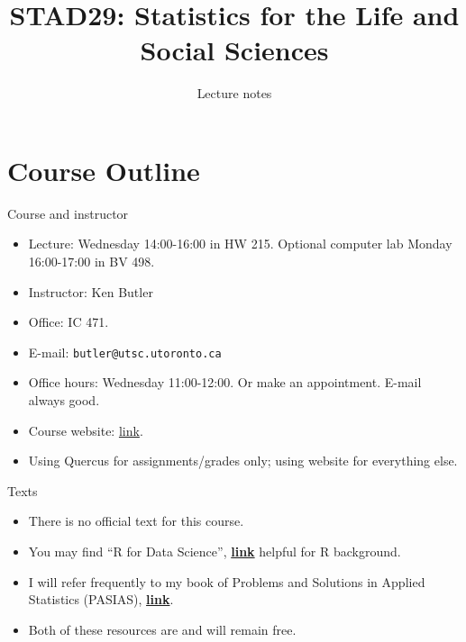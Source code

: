 \documentclass[
  ignorenonframetext,
]{beamer}
\title{STAD29: Statistics for the Life and Social Sciences}
\author{Lecture notes}
\date{}
\begin{document}
\frame{\titlepage}

\hypertarget{course-outline}{%
\section{Course Outline}\label{course-outline}}

\begin{frame}[fragile]{Course and instructor}
\protect\hypertarget{course-and-instructor}{}

\begin{itemize}
\item
  Lecture: Wednesday 14:00-16:00 in HW 215. Optional computer lab Monday
  16:00-17:00 in BV 498.
\item
  Instructor: Ken Butler
\item
  Office: IC 471.
\item
  E-mail: \texttt{butler@utsc.utoronto.ca}
\item
  Office hours: Wednesday 11:00-12:00. Or make an appointment. E-mail
  always good.
\item
  Course website: \href{http://ritsokiguess.site/STAD29/}{link}.
\item
  Using Quercus for assignments/grades only; using website for
  everything else.
\end{itemize}

\end{frame}

\begin{frame}{Texts}
\protect\hypertarget{texts}{}

\begin{itemize}
\item
  There is no official text for this course.
\item
  You may find ``R for Data Science'',
  \href{http://r4ds.had.co.nz/}{\textbf{link}} helpful for R background.
\item
  I will refer frequently to my book of Problems and Solutions in
  Applied Statistics (PASIAS),
  \href{http://ritsokiguess.site/pasias/}{\textbf{link}}.
\item
  Both of these resources are and will remain free.
\end{itemize}

\end{frame}
\end{document}
